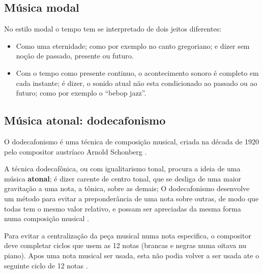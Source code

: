 \subsection{Música modal}
\label{sec:MusicaModal}

No estilo modal o tempo tem se interpretado de dois jeitos diferentes:
\begin{itemize}
\item Como uma eternidade; como por exemplo no canto gregoriano; e dizer 
sem noção de passado, presente ou futuro.
\item Com o tempo como presente continuo, 
o acontecimento sonoro é completo em cada instante; é dizer,
 o sonido atual não esta condicionado ao passado ou ao futuro;
como por exemplo o ``bebop jazz''\cite[pp. 156]{arbones2012armonia}.
\end{itemize}



\subsection{Música atonal: dodecafonismo}
\label{sec:MusicaAtonal}
O dodecafonismo é uma técnica de composição musical, 
criada na década de 1920 pelo compositor austríaco Arnold Schonberg \cite[pp. 121]{arbones2012armonia}\cite[pp. 263]{holst1998abc}.


A técnica dodecafônica, ou com igualitarismo tonal,
procura a ideia de uma música \textbf{atonal}; é dizer carente de centro tonal,
que se desliga de uma maior gravitação a uma nota, a tônica, sobre as demais;
O dodecafonismo desenvolve um método para evitar a preponderância de uma nota sobre outras,
de modo que todas tem o mesmo valor relativo,
e possam ser apreciadas da mesma forma numa composição musical 
\cite[pp. 122]{arbones2012armonia}.

Para evitar a centralização da peça musical numa nota especifica,
o compositor deve completar ciclos que usem as 12 notas 
(brancas e negras numa oitava nu piano). 
Apos uma nota musical ser usada, 
esta não podia volver a ser usada ate o seguinte ciclo de 12 notas \cite[pp. 123]{arbones2012armonia}.


